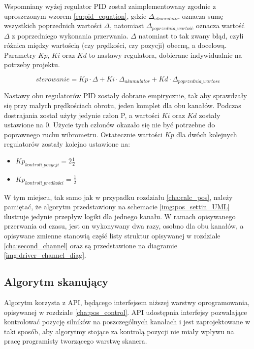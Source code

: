 Wspomniany wyżej regulator PID został zaimplementowany zgodnie z uproszczonym wzorem \ref{eq:pid_equation}, gdzie $\Delta_{akumulator}$ oznacza sumę wszystkich poprzednich wartości $\Delta$, natomiast $\Delta_{poprzednia\_wartość}$ oznacza wartość $\Delta$ z poprzedniego wykonania przerwania. $\Delta$ natomiast to tak zwany błąd, czyli różnica między wartością (czy prędkości, czy pozycji) obecną, a docelową. Parametry $Kp$, $Ki$ oraz $Kd$ to nastawy regulatora, dobierane indywidualnie na potrzeby projektu.

\begin{equation} \label{eq:pid_equation}
    sterowanie = Kp \cdot \Delta + Ki \cdot \Delta_{akumulator} + Kd \cdot \Delta_{poprzednia\_wartosc}
\end{equation}

Nastawy obu regulatorów PID zostały dobrane empirycznie, tak aby sprawdzały się przy małych prędkościach obrotu, jeden komplet dla obu kanałów. Podczas dostrajania został użyty jedynie człon P, a wartości $Ki$ oraz $Kd$ zostały ustawione na $0$. Użycie tych członów okazało się nie być potrzebne do poprawnego ruchu wibrometru. Ostatecznie wartości $Kp$ dla dwóch kolejnych regulatorów zostały kolejno ustawione na:
\vspace{-\topsep}
\begin{itemize}
    \item $Kp_{kontroli\_pozycji} = 2\frac{1}{2}$
    \item $Kp_{kontroli\_predkości} = \frac{1}{2}$
\end{itemize}

W tym miejscu, tak samo jak w przypadku rozdziału \ref{cha:calc_pos}, należy pamiętać, że algorytm przedstawiony na schemacie \ref{img:pos_settin_UML} ilustruje jedynie przepływ logiki dla jednego kanału. W ramach opisywanego przerwania od czasu, jest on wykonywany dwa razy, osobno dla obu kanałów, a opisywane zmienne stanowią część listy struktur opisywanej w rozdziale \ref{cha:second_channel} oraz są przedstawione na diagramie \ref{img:driver_channel_diag}.

\subsection{Algorytm skanujący}
\label{cha:scan_alg}
Algorytm korzysta z API, będącego interfejsem niższej warstwy oprogramowania, opisywanej w rozdziale \ref{cha:pos_control}. API udostępnia interfejsy pozwalające kontrolować pozycję silników na poszczególnych kanałach i jest zaprojektowane w taki sposób, aby algorytmy stojące za kontrolą pozycji nie miały wpływu na pracę programisty tworzącego warstwę skanera.

